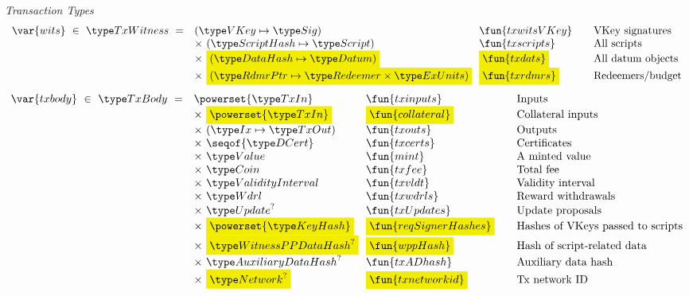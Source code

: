 \begin{figure*}[htb]
  \emph{Transaction Types}
  \begin{equation*}
    \begin{array}{r@{~~}l@{~~}l@{\qquad}l}
      \var{wits} ~\in~ \TxWitness ~=~
       & (\VKey \mapsto \Sig) & \fun{txwitsVKey} & \text{VKey signatures}\\
       & \times ~(\ScriptHash \mapsto \Script)  & \fun{txscripts} & \text{All scripts}\\
       & \times~ \hldiff{(\DataHash \mapsto \Datum)} & \hldiff{\fun{txdats}} & \text{All datum objects}\\
       & \times ~\hldiff{(\RdmrPtr \mapsto \Redeemer \times \ExUnits)}& \hldiff{\fun{txrdmrs}}& \text{Redeemers/budget}\\
    \end{array}
  \end{equation*}
  \begin{equation*}
    \begin{array}{r@{~~}l@{~~}l@{\qquad}l}
      \var{txbody} ~\in~ \TxBody ~=~
      & \powerset{\TxIn} & \fun{txinputs}& \text{Inputs}\\
      & \times ~\hldiff{\powerset{\TxIn}} & \hldiff{\fun{collateral}} & \text{Collateral inputs}\\
      & \times ~(\Ix \mapsto \TxOut) & \fun{txouts}& \text{Outputs}\\
      & \times~ \seqof{\DCert} & \fun{txcerts}& \text{Certificates}\\
       & \times ~\Value  & \fun{mint} &\text{A minted value}\\
       & \times ~\Coin & \fun{txfee} &\text{Total fee}\\
       & \times ~\ValidityInterval & \fun{txvldt} & \text{Validity interval}\\
       & \times~ \Wdrl  & \fun{txwdrls} &\text{Reward withdrawals}\\
       & \times ~\Update^?  & \fun{txUpdates} & \text{Update proposals}\\
       & \times ~\hldiff{\powerset{\KeyHash}} & \hldiff{\fun{reqSignerHashes}} & \text{Hashes of VKeys passed to scripts}\\
       & \times ~\hldiff{\WitnessPPDataHash^?} & \hldiff{\fun{wppHash}} & \text{Hash of script-related data}\\
       & \times ~\AuxiliaryDataHash^? & \fun{txADhash} & \text{Auxiliary data hash}\\
       & \times ~\hldiff{\Network^?} & \hldiff{\fun{txnetworkid}} & \text{Tx network ID}\\

\end{array}
\end{equation*}
\end{figure*}
